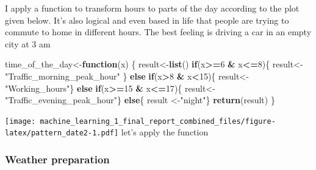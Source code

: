 \documentclass[
]{article}
\newenvironment{Shaded}{\begin{snugshade}}{\end{snugshade}}
\newcommand{\ControlFlowTok}[1]{\textcolor[rgb]{0.13,0.29,0.53}{\textbf{#1}}}
\newcommand{\DecValTok}[1]{\textcolor[rgb]{0.00,0.00,0.81}{#1}}
\newcommand{\KeywordTok}[1]{\textcolor[rgb]{0.13,0.29,0.53}{\textbf{#1}}}
\newcommand{\NormalTok}[1]{#1}
\newcommand{\OperatorTok}[1]{\textcolor[rgb]{0.81,0.36,0.00}{\textbf{#1}}}
\newcommand{\StringTok}[1]{\textcolor[rgb]{0.31,0.60,0.02}{#1}}
\begin{document}
I apply a function to transform hours to parts of the day according to
the plot given below. It's also logical and even based in life that
people are trying to commute to home in different hours. The best
feeling is driving a car in an empty city at 3 am

\begin{Shaded}
\begin{Highlighting}[]
\NormalTok{time_of_the_day<-}\ControlFlowTok{function}\NormalTok{(x) \{}
\NormalTok{  result<-}\KeywordTok{list}\NormalTok{()}
  \ControlFlowTok{if}\NormalTok{(x}\OperatorTok{>=}\DecValTok{6} \OperatorTok{&}\StringTok{ }\NormalTok{x}\OperatorTok{<=}\DecValTok{8}\NormalTok{)\{}
\NormalTok{    result<-}\StringTok{"Traffic_morning_peak_hour"}
\NormalTok{  \} }
  \ControlFlowTok{else} \ControlFlowTok{if}\NormalTok{(x}\OperatorTok{>}\DecValTok{8} \OperatorTok{&}\StringTok{ }\NormalTok{x}\OperatorTok{<}\DecValTok{15}\NormalTok{)\{}
\NormalTok{    result<-}\StringTok{"Working_hours"}\NormalTok{\}}
  \ControlFlowTok{else} \ControlFlowTok{if}\NormalTok{(x}\OperatorTok{>=}\DecValTok{15} \OperatorTok{&}\StringTok{ }\NormalTok{x}\OperatorTok{<=}\DecValTok{17}\NormalTok{)\{}
\NormalTok{    result<-}\StringTok{"Traffic_evening_peak_hour"}\NormalTok{\}}
  \ControlFlowTok{else}\NormalTok{\{}
\NormalTok{    result <-}\StringTok{"night"}\NormalTok{\}}
  \KeywordTok{return}\NormalTok{(result)}
\NormalTok{\}}
\end{Highlighting}
\end{Shaded}

\texttt{[image: machine\_learning\_1\_final\_report\_combined\_files/figure-latex/pattern\_date2-1.pdf]}
let's apply the function

\begin{Shaded}
\end{Shaded}

\hypertarget{weather-preparation}{%
\subsubsection{Weather preparation}\label{weather-preparation}}
\end{document}
